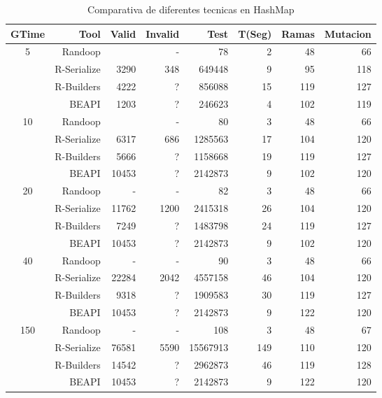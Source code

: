 \begin{table}[H]
\scriptsize
\centering
\begin{tabular}{ c  r  |r | r | r|r|r|r  }
  \toprule
  \textbf{GTime} & \textbf{Tool} & \textbf{Valid}  & \textbf{Invalid} & \textbf{Test}&\textbf{T(Seg)} &\textbf{Ramas}  & \textbf{Mutacion} \\ 
  \midrule
5	&	Randoop	&		&	-	&	78	&	2	&	48	&	66	\\
	&	R-Serialize	&	3290	&	348	&	649448	&	9	&	95	&	118	\\
	&	R-Builders	&	4222	&	?	&	856088	&	15	&	119	&	127	\\
	&	BEAPI	&	1203	&	?	&	246623	&	4	&	102	&	119	 \\
 \cline{2-8}															
10	&	Randoop	&		&	-	&	80	&	3	&	48	&	66	\\
	&	R-Serialize	&	6317	&	686	&	1285563	&	17	&	104	&	120	\\
	&	R-Builders	&	5666	&	?	&	1158668	&	19	&	119	&	127	\\
	&	BEAPI	&	10453	&	?	&	2142873	&	9	&	102	&	120	\\
 \cline{2-8}															
20	&	Randoop	&	-	&	-	&	82	&	3	&	48	&	66	\\
	&	R-Serialize	&	11762	&	1200	&	2415318	&	26	&	104	&	120	\\
	&	R-Builders	&	7249	&	?	&	1483798	&	24	&	119	&	127	\\
	&	BEAPI	&	10453	&	?	&	2142873	&	9	&	102	&	120	 \\
 \cline{2-8}															
40	&	Randoop	&	-	&	-	&	90	&	3	&	48	&	66	\\
	&	R-Serialize	&	22284	&	2042	&	4557158	&	46	&	104	&	120	\\
	&	R-Builders	&	9318	&	?	&	1909583	&	30	&	119	&	127	\\
	&	BEAPI	&	10453	&	?	&	2142873	&	9	&	122	&	120	\\ 
 \cline{2-8}															
150	&	Randoop	&	-	&	-	&	108	&	3	&	48	&	67	\\
	&	R-Serialize	&	76581	&	5590	&	15567913	&	149	&	110	&	120	\\
	&	R-Builders	&	14542	&	?	&	2962873	&	46	&	119	&	128	\\
	&	BEAPI	&	10453	&	?	&	2142873	&	9	&	122	&	120		\\
\midrule
\end{tabular}
\label{tab:hashMapTools}
\caption{Comparativa de diferentes tecnicas en HashMap}
\end{table}